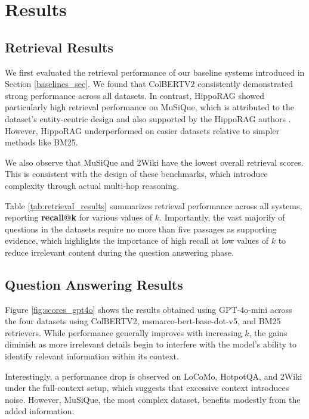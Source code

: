 \cleardoublepage
\chapter{Results}
\label{ch:results}
\label{ch:chapter4}

\section{Retrieval Results}

We first evaluated the retrieval performance of our baseline systems introduced in Section \ref{baselines_sec}. We found that ColBERTV2 consistently demonstrated strong performance across all datasets. In contrast, HippoRAG showed particularly high retrieval performance on MuSiQue, which is attributed to the dataset’s entity-centric design and also supported by the HippoRAG authors \cite{NEURIPS2024_6ddc001d}. However, HippoRAG underperformed on easier datasets relative to simpler methods like BM25. 

\noindent We also observe that MuSiQue and 2Wiki have the lowest overall retrieval scores. This is consistent with the design of these benchmarks, which introduce complexity through actual multi-hop reasoning.

\noindent Table \ref{tab:retrieval_results} summarizes retrieval performance across all systems, reporting \textbf{recall@k} for various values of $k$. Importantly, the vast majorify of questions in the datasets require no more than five passages as supporting evidence, which highlights the importance of high recall at low values of $k$ to reduce irrelevant content during the question answering phase.



\section{Question Answering Results}

\noindent Figure \ref{fig:scores_gpt4o} shows the results obtained using GPT-4o-mini across the four datasets using ColBERTV2, msmarco-bert-base-dot-v5, and BM25 retrievers. While performance generally improves with increasing $k$, the gains diminish as more irrelevant details begin to interfere with the model's ability to identify relevant information within its context.

\noindent Interestingly, a performance drop is observed on LoCoMo, HotpotQA, and 2Wiki under the full-context setup, which suggests that excessive context introduces noise. However, MuSiQue, the most complex dataset, benefits modestly from the added information.

